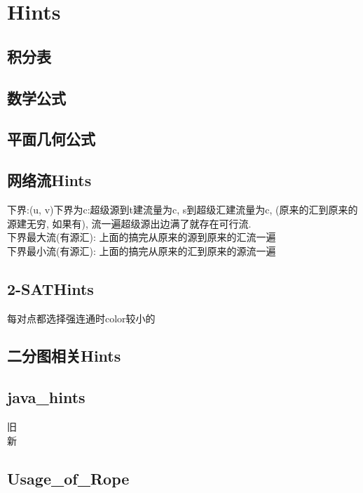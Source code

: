 \documentclass[a4paper,10pt]{book}
\begin{document}
\chapter{Hints}
	\section{积分表}
		
	\section{数学公式}
		
	\section{平面几何公式}
		
	\section{网络流Hints}
	下界:(u, v)下界为c:超级源到t建流量为c, s到超级汇建流量为c, (原来的汇到原来的源建无穷, 如果有), 流一遍超级源出边满了就存在可行流.\\
	下界最大流(有源汇): 上面的搞完从原来的源到原来的汇流一遍\\
	下界最小流(有源汇): 上面的搞完从原来的汇到原来的源流一遍\\
	\section{2-SATHints}
	每对点都选择强连通时color较小的\\
	\section{二分图相关Hints}
		
	\section{java\_hints}
		旧\\
		
		新\\
		
	\section{Usage\_of\_Rope}
		
\end{document}
